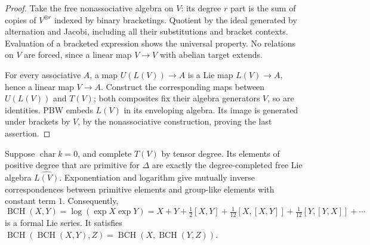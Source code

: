 \begin{proof}
Take the free nonassociative algebra on \(V\): its degree \(r\)
part is the sum of copies of \(V^{\otimes r}\) indexed by binary
bracketings. Quotient by the ideal generated by alternation
and Jacobi, including all their substitutions and bracket
contexts. Evaluation of a bracketed expression shows the
universal property. No relations on \(V\) are forced, since a
linear map \(V\to V\) with abelian target extends.

For every associative \(A\), a map \(U(L(V))\to A\) is a Lie map
\(L(V)\to A\), hence a linear map \(V\to A\). Construct the
corresponding maps between \(U(L(V))\) and \(T(V)\); both
composites fix their algebra generators \(V\), so are identities.
PBW embeds \(L(V)\) in its enveloping algebra. Its image is
generated under brackets by \(V\), by the nonassociative
construction, proving the last assertion.
\end{proof}

\begin{theorem}\label{res:A08}
Suppose \(\operatorname{char}k=0\), and complete \(T(V)\) by tensor
degree. Its elements of positive degree that are primitive for
\(\Delta\) are exactly the degree-completed free Lie algebra
\(\widehat{L(V)}\). Exponentiation and logarithm give mutually
inverse correspondences between primitive elements and
group-like elements with constant term \(1\). Consequently,
\[
 \operatorname{BCH}(X,Y)=\log(\exp X\exp Y)
 =X+Y+\tfrac12[X,Y]
   +\tfrac1{12}[X,[X,Y]]+\tfrac1{12}[Y,[Y,X]]+\cdots
 \tag{1.4}\label{eq:formal-bch}
\]
is a formal Lie series. It satisfies
\(\operatorname{BCH}(\operatorname{BCH}(X,Y),Z)
=\operatorname{BCH}(X,\operatorname{BCH}(Y,Z))\).
\end{theorem}

